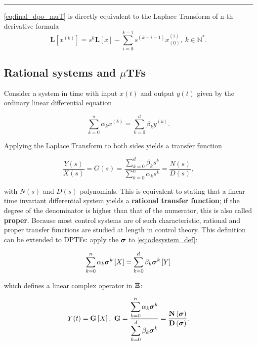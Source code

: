 \hrule
\vspace{3mm} %
\begin{remark} \eqref{eq:final_dpo_muT} is directly equivalent to the Laplace Transform of n-th derivative formula
\begin{equation}  \mathbf{L}\left[x^{(k)}\right] = s^k \mathbf{L}\left[x\right] - \sum_{i=0}^{k-1} s^{(k-i-1)}x^{(i)}_{(0)},\ k\in \mathbb{N}^* .\end{equation}
\end{remark}

\subsection{Rational systems and $\mu$TFs} %

	Consider a system in time with input $x(t)$ and output $y(t)$ given by the ordinary linear differential equation

\begin{equation} \sum_{k=0}^{n} \alpha_kx^{(k)} = \sum_{k=0}^{d} \beta_k y^{(k)} . \label{eq:odesystem_def}\end{equation}

	Applying the Laplace Transform to both sides yields a transfer function

\begin{equation} \dfrac{Y(s)}{X(s)} = G(s) = \dfrac{\displaystyle\sum_{k=0}^{d} \beta_k s^k}{\displaystyle\sum_{k=0}^{n} \alpha_k s^k} = \dfrac{N(s)}{D(s)},\end{equation}

	\noindent with $N(s)$ and $D(s)$ polynomials. This is equivalent to stating that a linear time invariant differential system yields a \textbf{rational transfer function}; if the degree of the denominator is higher than that of the numerator, this is also called \textbf{proper}. Because most control systems are of such characteristic, rational and proper transfer functions are studied at length in control theory. This definition can be extended to DPTFs: apply the $\boldsymbol{\sigma}$ to \eqref{eq:odesystem_def}:

\begin{equation} \sum_{k=0}^{n} \alpha_k \boldsymbol{\sigma}^{k}\left[X\right]  = \sum_{k=0}^{d} \beta_k \boldsymbol{\sigma}^{k}\left[Y\right] \label{eq:differental_dpo_system}\end{equation}

	\noindent which defines a linear complex operator in $\boldsymbol{\Xi}$:

\begin{equation} Y(t)  = \mathbf{G}\left[X\right],\ \mathbf{G} = \dfrac{\displaystyle\sum_{k=0}^{n} \alpha_k \ndpo{k}}{\displaystyle\sum_{k=0}^{d} \beta_k \ndpo{k}} = \dfrac{\mathbf{N}\left(\dpo\right)}{\mathbf{D}\left(\dpo\right)}.\end{equation}

